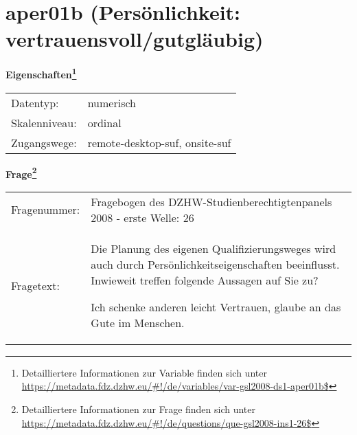 
    \setcounter{footnote}{0}

    \vspace*{-1.8cm}
	\section{aper01b (Persönlichkeit: vertrauensvoll/gutgläubig)}
	\label{section:aper01b}



    \vspace*{0.5cm}
    \noindent\textbf{Eigenschaften\footnote{Detailliertere Informationen zur Variable finden sich unter
		\url{https://metadata.fdz.dzhw.eu/\#!/de/variables/var-gsl2008-ds1-aper01b$}}}\\
	\begin{tabularx}{\hsize}{@{}lX}
	Datentyp: & numerisch \\
	Skalenniveau: & ordinal \\
	Zugangswege: &
	  remote-desktop-suf, 
	  onsite-suf
 \\
    \end{tabularx}



				\vspace*{0.5cm}
                \noindent\textbf{Frage\footnote{Detailliertere Informationen zur Frage finden sich unter
		              \url{https://metadata.fdz.dzhw.eu/\#!/de/questions/que-gsl2008-ins1-26$}}}\\
				\begin{tabularx}{\hsize}{@{}lX}
					Fragenummer: &
					  Fragebogen des DZHW-Studienberechtigtenpanels 2008 - erste Welle:
					  26
 \\
					Fragetext: & Die Planung des eigenen Qualifizierungsweges wird auch durch Persönlichkeitseigenschaften beeinflusst. Inwieweit treffen folgende Aussagen auf Sie zu?\par  Ich schenke anderen leicht Vertrauen, glaube an das Gute im Menschen. \\
				\end{tabularx}






